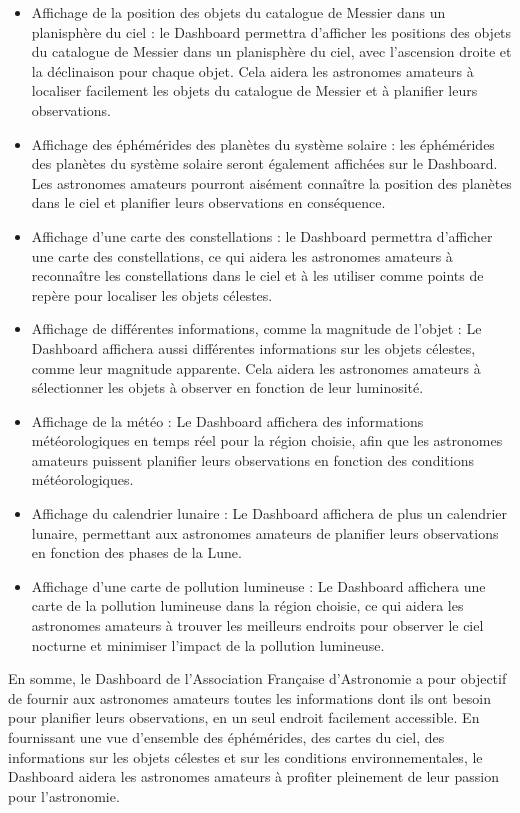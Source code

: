 \documentclass{article}
\begin{document}
\begin{itemize}
	\setlength\itemsep{0.5em}
	\item Affichage de la position des objets du catalogue de Messier dans un planisphère du ciel : le Dashboard permettra d'afficher les positions des objets du catalogue de Messier dans un planisphère du ciel, avec l'ascension droite et la déclinaison pour chaque objet. Cela aidera les astronomes amateurs à localiser facilement les objets du catalogue de Messier et à planifier leurs observations.
	\item Affichage des éphémérides des planètes du système solaire : les éphémérides des planètes du système solaire seront également affichées sur le Dashboard. Les astronomes amateurs pourront aisément connaître la position des planètes dans le ciel et planifier leurs observations en conséquence.
	\item Affichage d'une carte des constellations : le Dashboard permettra d'afficher une carte des constellations, ce qui aidera les astronomes amateurs à reconnaître les constellations dans le ciel et à les utiliser comme points de repère pour localiser les objets célestes.
	\item Affichage de différentes informations, comme la magnitude de l'objet : Le Dashboard affichera aussi différentes informations sur les objets célestes, comme leur magnitude apparente. Cela aidera les astronomes amateurs à sélectionner les objets à observer en fonction de leur luminosité.
	\item Affichage de la météo : Le Dashboard affichera des informations météorologiques en temps réel pour la région choisie, afin que les astronomes amateurs puissent planifier leurs observations en fonction des conditions météorologiques.
	\item Affichage du calendrier lunaire : Le Dashboard affichera de plus un calendrier lunaire, permettant aux astronomes amateurs de planifier leurs observations en fonction des phases de la Lune.
	\item Affichage d'une carte de pollution lumineuse : Le Dashboard affichera une carte de la pollution lumineuse dans la région choisie, ce qui aidera les astronomes amateurs à trouver les meilleurs endroits pour observer le ciel nocturne et minimiser l'impact de la pollution lumineuse.
\end{itemize}

En somme, le Dashboard de l'Association Française d'Astronomie a pour objectif de fournir aux astronomes amateurs toutes les informations dont ils ont besoin pour planifier leurs observations, en un seul endroit facilement accessible. En fournissant une vue d'ensemble des éphémérides, des cartes du ciel, des informations sur les objets célestes et sur les conditions environnementales, le Dashboard aidera les astronomes amateurs à profiter pleinement de leur passion pour l'astronomie.
\end{document}
